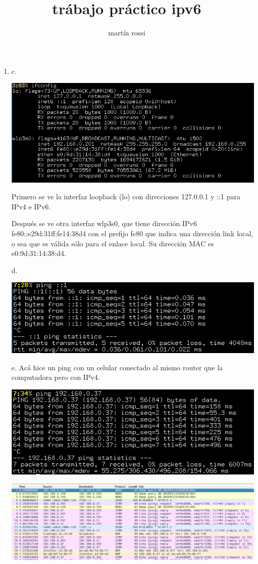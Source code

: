 \documentclass[11pt]{article}
\author{martín rossi}
\date{}
\title{trábajo práctico ipv6}
\begin{document}
\maketitle
\begin{enumerate}
\item c.
\begin{center}
\includegraphics[width=.9\linewidth]{./1c.png}
\end{center}
Primero se ve la interfaz loopback (lo) con direcciones 127.0.0.1 y ::1 para IPv4 e IPv6.

Después se ve otra interfaz wlp3s0, que tiene dirección IPv6 fe80::e29d:31ff:fe14:38d4 con el prefijo fe80 que indica una dirección link local, o sea que es válida sólo para el enlace local. Su dirección MAC es e0:9d:31:14:38:d4.

d.
\begin{center}
\includegraphics[width=.9\linewidth]{./1d.png}
\end{center}

e.
Acá hice un ping con un celular conectado al mismo router que la computadora pero con IPv4.

\begin{center}
\includegraphics[width=.9\linewidth]{./1ea.png}
\end{center}
\begin{center}
\includegraphics[width=.9\linewidth]{./1eb.png}
\end{center}


\end{enumerate}
\end{document}
